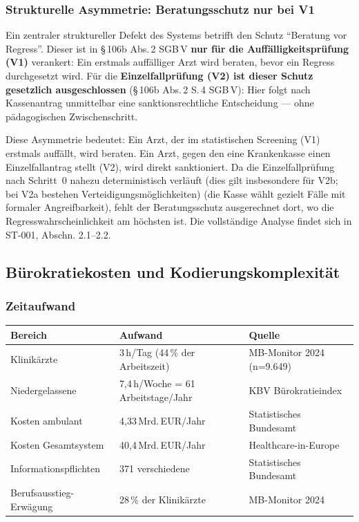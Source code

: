 \documentclass{umbruch-position}
\begin{document}
\subsubsection{Strukturelle Asymmetrie: Beratungsschutz nur bei V1}

Ein zentraler struktureller Defekt des Systems betrifft den Schutz ``Beratung vor Regress''. Dieser ist in \S\,106b Abs.\,2 SGB\,V \textbf{nur für die Auffälligkeitsprüfung (V1)} verankert: Ein erstmals auffälliger Arzt wird beraten, bevor ein Regress durchgesetzt wird. Für die \textbf{Einzelfallprüfung (V2) ist dieser Schutz gesetzlich ausgeschlossen} (\S\,106b Abs.\,2 S.\,4 SGB\,V): Hier folgt nach Kassenantrag unmittelbar eine sanktionsrechtliche Entscheidung --- ohne pädagogischen Zwischenschritt.

Diese Asymmetrie bedeutet: Ein Arzt, der im statistischen Screening (V1) erstmals auffällt, wird beraten. Ein Arzt, gegen den eine Krankenkasse einen Einzelfallantrag stellt (V2), wird direkt sanktioniert. Da die Einzelfallprüfung nach Schritt~0 nahezu deterministisch verläuft (dies gilt insbesondere für V2b; bei V2a bestehen Verteidigungsmöglichkeiten) (die Kasse wählt gezielt Fälle mit formaler Angreifbarkeit), fehlt der Beratungsschutz ausgerechnet dort, wo die Regresswahrscheinlichkeit am höchsten ist. Die vollständige Analyse findet sich in ST-001, Abschn. 2.1--2.2.

\subsection{Bürokratiekosten und Kodierungskomplexität}

\subsubsection{Zeitaufwand}

{\small
\begin{tabularx}{\textwidth}{X X X}
\toprule
\textbf{Bereich} & \textbf{Aufwand} & \textbf{Quelle} \\
\midrule
Klinikärzte & 3\,h/Tag (44\,\% der Arbeitszeit) & MB-Monitor 2024 (n=9.649) \\
Niedergelassene & 7,4\,h/Woche = 61 Arbeitstage/Jahr & KBV Bürokratieindex \\
Kosten ambulant & 4,33\,Mrd.\,EUR/Jahr & Statistisches Bundesamt \\
Kosten Gesamtsystem & 40,4\,Mrd.\,EUR/Jahr & Healthcare-in-Europe \\
Informationspflichten & 371 verschiedene & Statistisches Bundesamt \\
Berufsausstieg-Erwägung & 28\,\% der Klinikärzte & MB-Monitor 2024 \\
\bottomrule
\end{tabularx}
}
\end{document}
